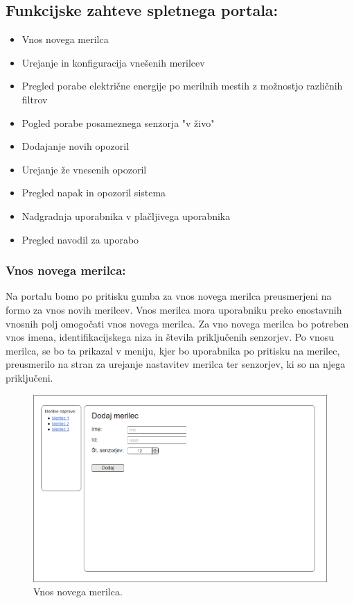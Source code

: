 \documentclass[12pt,a4paper,titlepage,openany]{report}
\begin{document}
\newpage
\subsection{Funkcijske zahteve spletnega portala:}



\begin{itemize}
\item Vnos novega merilca
\item Urejanje in konfiguracija vnešenih merilcev
\item Pregled porabe električne energije po merilnih mestih z možnostjo različnih filtrov
\item Pogled porabe posameznega senzorja "v živo"
\item Dodajanje novih opozoril
\item Urejanje že vnesenih opozoril
\item Pregled napak in opozoril sistema
\item Nadgradnja uporabnika v plačljivega uporabnika
\item Pregled navodil za uporabo
\end{itemize}

\subsubsection{Vnos novega merilca:}
Na portalu bomo po pritisku gumba za vnos novega merilca preusmerjeni na formo za vnos novih merilcev. Vnos merilca mora uporabniku preko enostavnih vnosnih polj omogočati vnos novega merilca. Za vno novega merilca bo potreben vnos imena, identifikacijskega niza in števila priključenih senzorjev. Po vnosu merilca, se bo ta prikazal v meniju, kjer bo uporabnika po pritisku na merilec, preusmerilo na stran za urejanje nastavitev merilca ter senzorjev, ki so na njega priključeni.

\begin{figure}[H]
\begin{center}
\includegraphics[width=1\linewidth]{Slike/VnosNovegaMerilca.png}
\end{center}
\caption{Vnos novega merilca.}\label{slika:VnosNovegaMerilca}
\end{figure}
\end{document}
